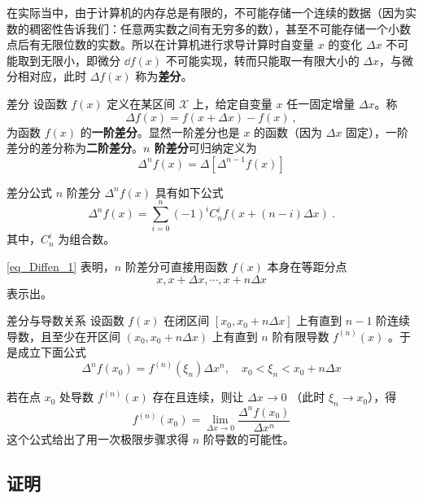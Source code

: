 在实际当中，由于计算机的内存总是有限的，不可能存储一个连续的数据（因为实数的稠密性告诉我们：任意两实数之间有无穷多的数），甚至不可能存储一个小数点后有无限位数的实数。所以在计算机进行求导计算时自变量 $x$ 的变化 $\Delta x$ 不可能取到无限小，即微分 $\dd f({x})$ 不可能实现，转而只能取一有限大小的 $\Delta x$，与微分相对应，此时 $\Delta f(x)$ 称为\textbf{差分}。
\begin{definition}{差分}
设函数 $f(x)$ 定义在某区间 $\mathcal{X}$ 上，给定自变量 $x$ 任一固定增量 $\Delta x$。称
\begin{equation}
\Delta f(x)=f(x+\Delta x)-f(x)~,
\end{equation}
为函数 $f(x)$ 的\textbf{一阶差分}。显然一阶差分也是 $x$ 的函数（因为 $\Delta x$ 固定），一阶差分的差分称为\textbf{二阶差分}。\textbf{$n$ 阶差分}可归纳定义为
\begin{equation}
\Delta^n f(x)=\Delta[\Delta^{n-1}f(x)]
\end{equation}
\end{definition}
\begin{theorem}{差分公式}\label{the_Diffen_1}
$n$ 阶差分 $\Delta^n f(x)$ 具有如下公式
\begin{equation}\label{eq_Diffen_1}
\Delta^nf(x)=\sum_{i=0}^n(-1)^iC_n^if(x+(n-i)\Delta x)~.
\end{equation}
其中，$C_n^i$ 为组合数。
\end{theorem}
\autoref{eq_Diffen_1} 表明，$n$ 阶差分可直接用函数 $f(x)$ 本身在等距分点
\begin{equation}
x,x+\Delta x,\cdots,x+n\Delta x
\end{equation}
表示出。
\begin{theorem}{差分与导数关系}\label{the_Diffen_2}
设函数 $f(x)$ 在闭区间 $[x_0,x_0+n\Delta x]$ 上有直到 $n-1$ 阶连续导数，且至少在开区间 $(x_0,x_0+n\Delta x)$ 上有直到 $n$ 阶有限导数 $f^{(n)}(x)$ 。于是成立下面公式
\begin{equation}\label{eq_Diffen_2}
\Delta^nf(x_0)=f^{(n)}(\xi_n)\Delta x^n ,\quad x_0<\xi_n<x_0+n\Delta x
\end{equation}
\end{theorem}
若在点 $x_0$ 处导数 $f^{(n)}(x)$ 存在且连续，则让 $\Delta x\rightarrow0$ （此时 $\xi_n\rightarrow x_0$），得
\begin{equation}
f^{(n)}(x_0)=\lim_{\Delta x\rightarrow0}\frac{\Delta^n f(x_0)}{\Delta x^n}
\end{equation}
 这个公式给出了用一次极限步骤求得 $n$ 阶导数的可能性。
\subsection{证明}
